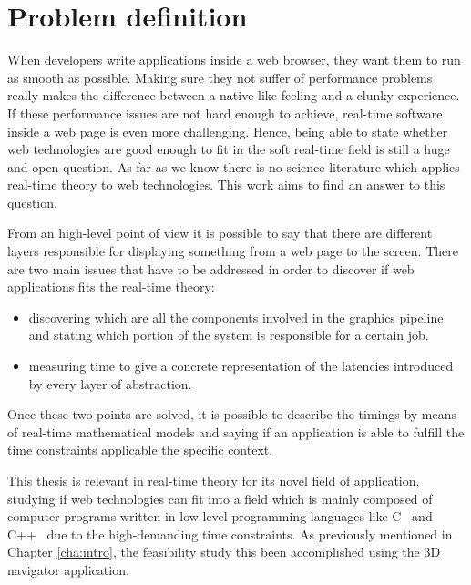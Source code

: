 \chapter{Problem definition} \label{cha:problem_definition}

When developers write applications inside a web browser, they want them to run
as smooth as possible. Making sure they not suffer of performance problems really
makes the difference between a native-like feeling and a clunky experience.
If these performance issues are not hard enough to achieve, real-time software
inside a web page is even more challenging. Hence, being able to state whether
web technologies are good enough to fit in the soft real-time field is still a
huge and open question. As far as we know there is no science literature which
applies real-time theory to web technologies. This work aims to find an answer
to this question.

From an high-level point of view it is possible to say that there are different
layers responsible for displaying something from a web page to the screen.
There are two main issues that have to be addressed in order to discover if web
applications fits the real-time theory:
\begin{itemize}
    \item discovering which are all the components involved in the graphics
        pipeline and stating which portion of the system is responsible for a
        certain job.
    \item measuring time to give a concrete representation of the latencies
        introduced by every layer of abstraction.
\end{itemize}

Once these two points are solved, it is possible to describe the timings by means
of real-time mathematical models and saying if an application is able to fulfill
the time constraints applicable the specific context.

This thesis is relevant in real-time theory for its novel field of application, studying
if web technologies can fit into a field which is mainly composed of computer
programs written in low-level programming languages like C~\cite{kernighan2006c}
and C++~\cite{stroustrup1995c++} due to the high-demanding time constraints.
As previously mentioned in Chapter \ref{cha:intro}, the feasibility study this
been accomplished using the 3D navigator application.
